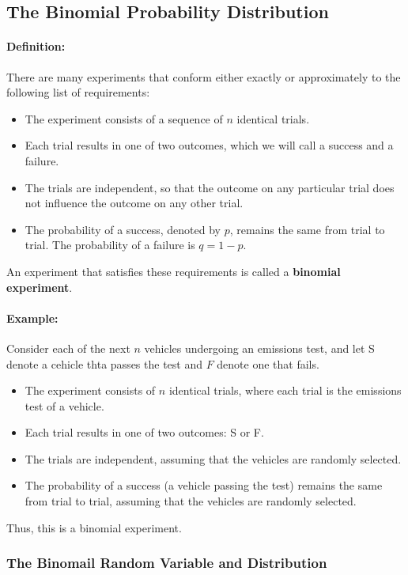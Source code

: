 \subsection{The Binomial Probability Distribution}
\hrulefill

\paragraph*{Definition:}
There are many experiments that conform either exactly or approximately to the following list of requirements:
\begin{itemize}
    \item The experiment consists of a sequence of $n$ identical trials.
    \item Each trial results in one of two outcomes, which we will call a success and a failure.
    \item The trials are independent, so that the outcome on any particular trial does not influence the outcome on any other trial.
    \item The probability of a success, denoted by $p$, remains the same from trial to trial. The probability of a failure is $q = 1 - p$.
\end{itemize}
An experiment that satisfies these requirements is called a \textbf{binomial experiment}.

\paragraph*{Example:}
Consider each of the next $n$ vehicles undergoing an emissions test, and let S denote a cehicle thta passes the test and $F$ denote one that fails.
\begin{itemize}
    \item The experiment consists of $n$ identical trials, where each trial is the emissions test of a vehicle.
    \item Each trial results in one of two outcomes: S or F.
    \item The trials are independent, assuming that the vehicles are randomly selected.
    \item The probability of a success (a vehicle passing the test) remains the same from trial to trial, assuming that the vehicles are randomly selected.
\end{itemize}
Thus, this is a binomial experiment.

\subsubsection*{The Binomail Random Variable and Distribution}

